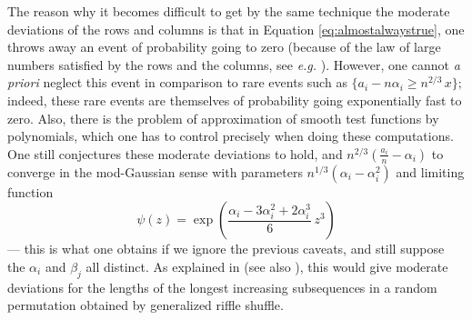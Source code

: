 \documentclass[12pt,a4paper,reqno]{amsart}
\theoremstyle{remark}
\begin{document}
The reason why it becomes difficult to get by the same technique the moderate deviations of the rows and columns is that in Equation \eqref{eq:almostalwaystrue}, one throws away an event of probability going to zero (because of the law of large numbers satisfied by the rows and the columns, see \emph{e.g.} \cite{KV81}). However, one cannot \emph{a priori} neglect this event in comparison to rare events such as $\{ a_{i}-n\alpha_{i} \geq n^{2/3}\,x\};$ indeed, these rare events are themselves of probability going exponentially fast to zero. Also, there is the problem of approximation of smooth test functions by polynomials, which one has to control precisely when doing these computations. One still conjectures these moderate deviations to hold, and $n^{2/3}\left(\frac{a_{i}}{n}-\alpha_{i}\right)$ to converge in the mod-Gaussian sense with parameters $n^{1/3}(\alpha_{i}-\alpha_{i}^{2})$ and limiting function $$\psi(z)=\exp\left(\frac{\alpha_{i}-3\alpha_{i}^{2}+2\alpha_{i}^{3}}{6}\,z^{3}\right)$$ --- this is what one obtains if we ignore the previous caveats, and still suppose the $\alpha_{i}$ and $\beta_{j}$ all distinct. As explained in \cite{Mel12} (see also \cite{KV86}), this would give moderate deviations for the lengths of the longest increasing subsequences in a random permutation obtained by generalized riffle shuffle.\bigskip
\bigskip
\bigskip
























\newpage



\end{document}
